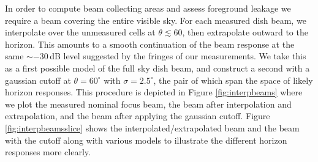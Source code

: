 \documentclass{emulateapj}
\begin{document}

In order to compute beam collecting areas and assess foreground leakage we require a beam covering the entire visible sky. For each measured dish beam, we interpolate over the unmeasured cells at $\theta\lesssim60$, then extrapolate outward to the horizon. This amounts to a smooth continuation of the beam response at the same $\sim-30$\,dB level suggested by the fringes of our measurements. We take this as a first possible model of the full sky dish beam, and construct a second with a gaussian cutoff at $\theta=60^\circ$ with $\sigma=2.5^\circ$, the pair of which span the space of likely horizon responses. This procedure is depicted in Figure \ref{fig:interpbeams} where we plot the measured nominal focus beam, the beam after interpolation and extrapolation, and the beam after applying the gaussian cutoff. Figure \ref{fig:interpbeamsslice} shows the interpolated/extrapolated beam and the beam with the cutoff along with various models to illustrate the different horizon responses more clearly.


\end{document}
